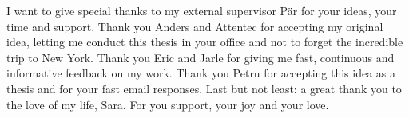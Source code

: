 
I want to give special thanks to my external supervisor Pär for your ideas,
your time and support. Thank you Anders and Attentec for accepting my original
idea, letting me conduct this thesis in your office and not to forget the
incredible trip to New York. Thank you Eric and Jarle for giving me fast,
continuous and informative feedback on my work. Thank you Petru for accepting
this idea as a thesis and for your fast email responses. Last but not least: a
great thank you to the love of my life, Sara. For you support, your joy and
your love.
